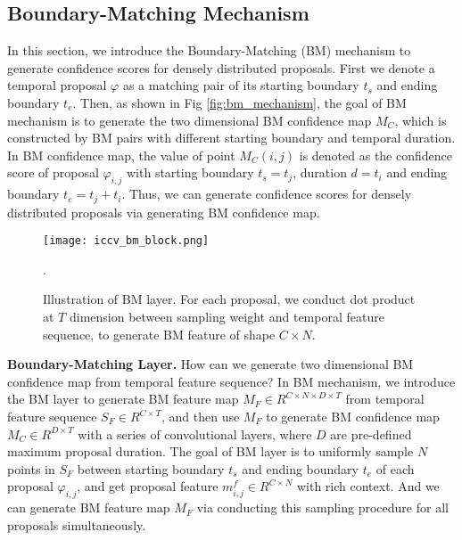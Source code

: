 \documentclass[10pt,twocolumn,letterpaper]{article}
\begin{document}
\subsection{Boundary-Matching Mechanism}

In this section, we introduce the Boundary-Matching (BM) mechanism to generate confidence scores for densely distributed proposals. 
First we denote a temporal proposal $\varphi$ as a matching pair of its starting boundary $t_s$ and  ending boundary $t_e$. 
Then, as shown in Fig \ref{fig:bm_mechanism}, the goal of BM mechanism is to generate the two dimensional BM confidence map $M_C$, which is constructed by BM pairs with different starting boundary and temporal duration.
In BM confidence map, the value of point $M_C (i,j)$ is denoted as the confidence score of  proposal $\varphi_{i,j}$ with starting boundary $t_s = t_j$, duration $d = t_i$ and ending boundary  $t_e = t_j + t_i$. 
Thus, we can generate confidence scores for densely distributed proposals via generating BM confidence map.


\begin{figure}[t]
\begin{center}
\begin{minipage}[b]{1.0\linewidth}
  \centering
  \centerline{\texttt{[image: iccv\_bm\_block.png]}}
  \medskip
\end{minipage}
\end{center}
   \caption{Illustration of BM layer. For each proposal, we conduct dot product at $T$ dimension between sampling weight and temporal feature sequence, to generate BM feature of shape $C\times N$.}.
   \label{fig:bm_layer}
\end{figure}




\noindent
\textbf{Boundary-Matching Layer.} 
How can we generate two dimensional BM confidence map from temporal feature sequence?
In BM mechanism, we introduce the BM layer to generate BM feature map $M_F \in R^{C \times N \times D \times T}$ from temporal feature sequence $S_F \in R^{C \times T}$, and then use $M_F$ to generate BM confidence map $M_C \in R^{D\times T}$ with a series of convolutional layers, where $D$ are pre-defined maximum proposal duration.
The goal of BM layer is to uniformly sample $N$ points in $S_F$ between starting boundary $t_s$ and ending boundary $t_e$ of each proposal $\varphi_{i,j}$, and get proposal feature $m^f_{i,j} \in R^{C\times N}$ with rich context.
And we can generate BM feature map $M_F$ via conducting this sampling procedure for all proposals simultaneously.
\end{document}
